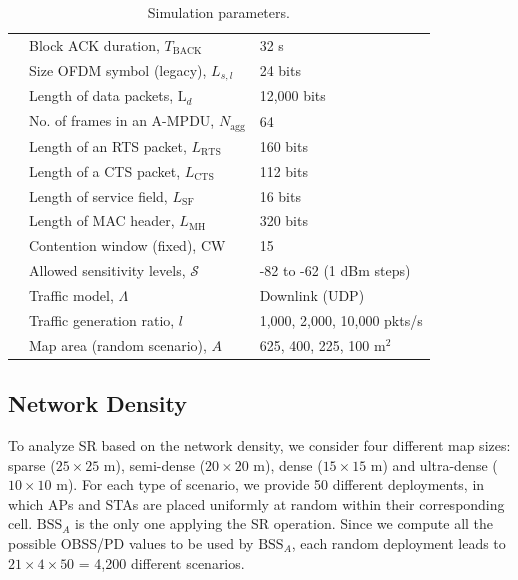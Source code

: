 \documentclass{ieeeaccess}
\begin{document}
\begin{table}[h]
{\begin{tabular}{c|l|l|}
			\cline{2-3} 
			\multicolumn{1}{|c|}{} & Block ACK duration, $T_\text{BACK}$ & 32 \textmu s \\
			\cline{2-3} 
			\multicolumn{1}{|c|}{} &  Size OFDM symbol (legacy), $L_{s,l}$ & 24 bits \\
			\cline{2-3} 
			\multicolumn{1}{|c|}{} & Length of data packets, $\text{L}_{d}$ & 12,000 bits \\
			\cline{2-3} 
			\multicolumn{1}{|c|}{} & No. of frames in an A-MPDU, $N_{\text{agg}}$ & 64 \\
			\cline{2-3} 
			\multicolumn{1}{|c|}{} & Length of an RTS packet, $L_\text{RTS}$ & 160 bits \\
			\cline{2-3} 
			\multicolumn{1}{|c|}{} & Length of a CTS packet, $L_\text{CTS}$ & 112 bits \\
			\cline{2-3} 
			\multicolumn{1}{|c|}{} & Length of service field, $L_\text{SF}$ & 16 bits  \\
			\cline{2-3} 
			\multicolumn{1}{|c|}{} & Length of MAC header, $L_\text{MH}$ & 320 bits \\
			\cline{2-3} 
			\multicolumn{1}{|c|}{} & Contention window (fixed), $\text{CW}$ & 15 \\
			\cline{2-3} 
			\multicolumn{1}{|c|}{} & Allowed sensitivity levels, $\mathcal{S}$ & -82 to -62 (1 dBm steps) \\
			\hline
			\multicolumn{1}{|c|}{\multirow{2}{*}{\centering\rotatebox[origin=c]{90}{Misc.  }}} & Traffic model, $\Lambda$ & Downlink (UDP)\\
			\cline{2-3} 
			\multicolumn{1}{|c|}{} & Traffic generation ratio, $l$ & 1,000, 2,000, 10,000 pkts/s\\ 
			\cline{2-3} 
			\multicolumn{1}{|c|}{} & Map area (random scenario), $A$ & 625, 400, 225, 100 m$^2$\\
			\hline
	\end{tabular}}
	\caption{Simulation parameters.}
	\label{table:parameters}
\end{table}

\subsection{Network Density}
\label{section:random_scenarios_density}
To analyze SR based on the network density, we consider four different map sizes: sparse ($25\times25$ m), semi-dense ($20\times20$ m), dense ($15\times15$ m) and ultra-dense ($10\times10$ m). For each type of scenario, we provide 50 different deployments, in which APs and STAs are placed uniformly at random within their corresponding cell. $\text{BSS}_A$ is the only one applying the SR operation. Since we compute all the possible OBSS/PD values to be used by $\text{BSS}_A$, each random deployment leads to $21\times4\times50$ = 4,200 different scenarios.
\end{document}
